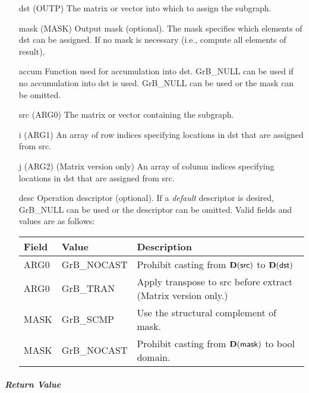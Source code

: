 \begin{itemize}[leftmargin=1.1in]
    \item[{\sf dst}]   ({\sf OUTP}) The matrix or vector into which to assign the subgraph.
    \item[{\sf mask}]  ({\sf MASK}) Output mask (optional). The mask
    specifies which elements of {\sf dst} can be assigned.
    If no mask is necessary (i.e., compute all elements of result),
    \item[{\sf accum}] Function used for accumulation into dst.  {\sf GrB\_NULL}
                       can be used if no accumulation into dst is used.
    {\sf GrB\_NULL} can be used or the mask can be omitted.
    \item[{\sf src}]   ({\sf ARG0}) The matrix or vector containing the subgraph.
    \item[{\sf i}]     ({\sf ARG1}) An array of row indices specifying locations in dst that
                       are assigned from src.
    \item[{\sf j}]     ({\sf ARG2}) (Matrix version only) An array of column indices 
                       specifying locations in dst that are assigned from src.


    \item[{\sf desc}]   Operation descriptor (optional). If a
    \emph{default} descriptor is desired, {\sf GrB\_NULL} can be
    used or the descriptor can be omitted.  Valid fields and values are as follows: \\
    \begin{tabular}{lll}
    Field  & Value & Description \\
    \hline
    {\sf ARG0} & {\sf GrB\_NOCAST} & Prohibit casting from $\bold{D}({\sf src})$ to $\bold{D}({\sf dst})$ \\
    {\sf ARG0} & {\sf GrB\_TRAN} & Apply transpose to {\sf src} before extract (Matrix version only.) \\
    {\sf MASK} & {\sf GrB\_SCMP} & Use the structural complement of {\sf mask}. \\
    {\sf MASK} & {\sf GrB\_NOCAST} & Prohibit casting from $\bold{D}({\sf mask})$ to {\sf bool} domain. \\
    \end{tabular}

\end{itemize}

\subparagraph{Return Value}


